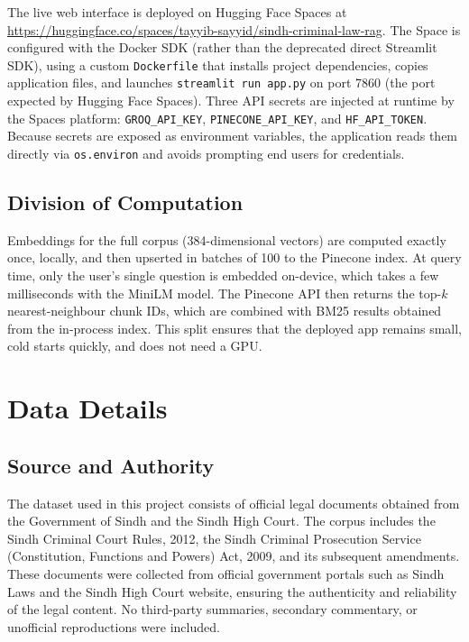 \documentclass[11pt,a4paper]{article}
\begin{document}
The live web interface is deployed on Hugging Face Spaces at\\
\url{https://huggingface.co/spaces/tayyib-sayyid/sindh-criminal-law-rag}. The Space is configured with the Docker SDK (rather than the deprecated direct Streamlit SDK), using a custom \texttt{Dockerfile} that installs project dependencies, copies application files, and launches \texttt{streamlit run app.py} on port 7860 (the port expected by Hugging Face Spaces). Three API secrets are injected at runtime by the Spaces platform: \texttt{GROQ\_API\_KEY}, \texttt{PINECONE\_API\_KEY}, and \texttt{HF\_API\_TOKEN}. Because secrets are exposed as environment variables, the application reads them directly via \texttt{os.environ} and avoids prompting end users for credentials.

\subsection{Division of Computation}

Embeddings for the full corpus (384-dimensional vectors) are computed exactly once, locally, and then upserted in batches of 100 to the Pinecone index. At query time, only the user's single question is embedded on-device, which takes a few milliseconds with the MiniLM model. The Pinecone API then returns the top-$k$ nearest-neighbour chunk IDs, which are combined with BM25 results obtained from the in-process index. This split ensures that the deployed app remains small, cold starts quickly, and does not need a GPU.

\newpage
\section{Data Details}
\label{sec:data}

\subsection{Source and Authority}

The dataset used in this project consists of official legal documents obtained from the Government of Sindh and the Sindh High Court. The corpus includes the Sindh Criminal Court Rules, 2012, the Sindh Criminal Prosecution Service (Constitution, Functions and Powers) Act, 2009, and its subsequent amendments. These documents were collected from official government portals such as Sindh Laws and the Sindh High Court website, ensuring the authenticity and reliability of the legal content. No third-party summaries, secondary commentary, or unofficial reproductions were included.
\end{document}
